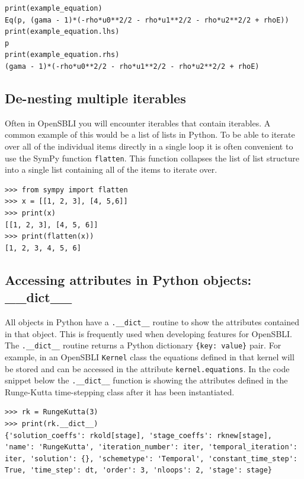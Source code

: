 \documentclass[11pt]{article}
\begin{document}
\begin{lstlisting}
print(example_equation)
Eq(p, (gama - 1)*(-rho*u0**2/2 - rho*u1**2/2 - rho*u2**2/2 + rhoE))
print(example_equation.lhs)
p
print(example_equation.rhs)
(gama - 1)*(-rho*u0**2/2 - rho*u1**2/2 - rho*u2**2/2 + rhoE)
\end{lstlisting}

\subsection{De-nesting multiple iterables}
Often in OpenSBLI you will encounter iterables that contain iterables. A common example of this would be a list of lists in Python. To be able to iterate over all of the individual items directly in a single loop it is often convenient to use the SymPy function \verb|flatten|. This function collapses the list of list structure into a single list containing all of the items to iterate over.
\begin{lstlisting}
>>> from sympy import flatten
>>> x = [[1, 2, 3], [4, 5,6]]
>>> print(x)
[[1, 2, 3], [4, 5, 6]]
>>> print(flatten(x))
[1, 2, 3, 4, 5, 6]
\end{lstlisting}

\subsection{Accessing attributes in Python objects: \_\_dict\_\_}

All objects in Python have a \verb|.__dict__| routine to show the attributes contained in that object. This is frequently used when developing features for OpenSBLI. The \verb|.__dict__| routine returns a Python dictionary \verb|{key: value}| pair. For example, in an OpenSBLI \verb|Kernel| class the equations defined in that kernel will be stored and can be accessed in the attribute \verb|kernel.equations|. In the code snippet below the \verb|.__dict__| function is showing the attributes defined in the Runge-Kutta time-stepping class after it has been instantiated.

\begin{lstlisting}
>>> rk = RungeKutta(3)
>>> print(rk.__dict__)
{'solution_coeffs': rkold[stage], 'stage_coeffs': rknew[stage], 'name': 'RungeKutta', 'iteration_number': iter, 'temporal_iteration': iter, 'solution': {}, 'schemetype': 'Temporal', 'constant_time_step': True, 'time_step': dt, 'order': 3, 'nloops': 2, 'stage': stage}
\end{lstlisting}
\end{document}
